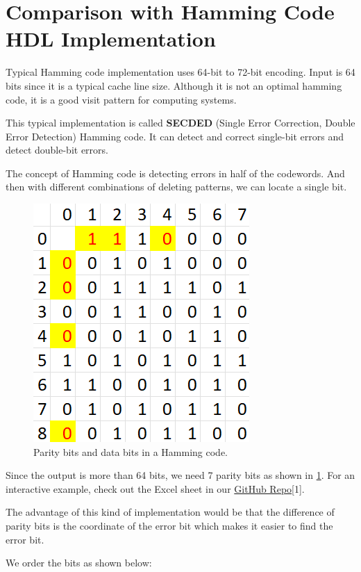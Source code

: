 \documentclass[conference]{IEEEtran}
\begin{document}
\section{Comparison with Hamming Code HDL Implementation}
Typical Hamming code implementation uses 64-bit to 72-bit encoding. Input is 64
bits since it is a typical cache line size. Although it is not an optimal
hamming code, it is a good visit pattern for computing systems.

This typical implementation is called \textbf{SECDED} (Single Error Correction,
Double Error Detection) Hamming code. It can detect and correct single-bit
errors and detect double-bit errors.

The concept of Hamming code is detecting errors in half of the codewords. And
then with different combinations of deleting patterns, we can locate a single
bit.

\begin{figure}[htbp]
  \centerline{\includegraphics{Images/Hamming_example.png}}
  \caption{Parity bits and data bits in a Hamming code.}
  \label{fig_2}
\end{figure}

Since the output is more than 64 bits, we need 7 parity bits as shown in
\ref{fig_2}. For an interactive example, check out the Excel sheet in our
\href{https://github.com/luckunately/ELEC433-Projects}{GitHub Repo}[1]. %

The advantage of this kind of implementation would be that the difference of
parity bits is the coordinate of the error bit which makes it easier to find
the error bit.

We order the bits as shown below:
\end{document}
